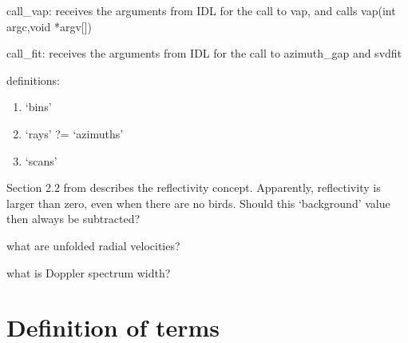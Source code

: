 \begin{enumerate}
call\_vap: receives the arguments from IDL for the call to vap, and calls
         vap(int argc,void *argv[])

call\_fit: receives the arguments from IDL for the call to azimuth\_gap
         and svdfit



definitions:
\begin{enumerate}
\item{`bins'}
\item{`rays' ?= `azimuths'}
\item{`scans'}
\end{enumerate}

Section 2.2 from \citep{dokt-liec-holl-2009} describes the reflectivity concept. Apparently, reflectivity is larger than zero, even when there are no birds. Should this `background' value then always be subtracted?

what are unfolded radial velocities?

what is Doppler spectrum width?

\section{Definition of terms}


\end{enumerate}
